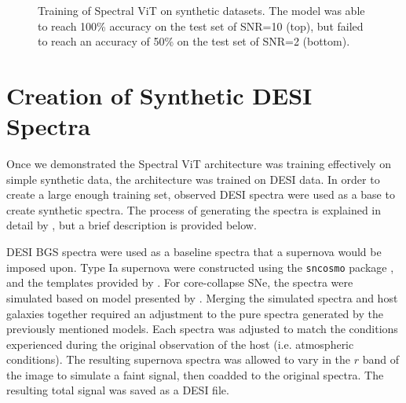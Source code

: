 \begin{figure}[h]
    \centering
    \qquad
    \caption[Verification of ViT: Synthetic Dataset]{Training of Spectral ViT on synthetic datasets. The model was able to reach 100\% accuracy on the test set of SNR=10 (top), 
    but failed to reach an accuracy of 50\% on the test set of SNR=2 (bottom).}
\label{fig:synth_spectra_training}
\end{figure}



\section{Creation of Synthetic DESI Spectra}
\label{sec:synth_data}
Once we demonstrated the Spectral ViT architecture was training effectively on simple synthetic data,
the architecture was trained on DESI data. In order to create a large enough training 
set, observed DESI spectra were used as a base to create synthetic spectra. The process of 
generating the spectra is explained in detail by \textcite{Sepeku2022}, but a brief 
description is provided below. 

DESI BGS spectra were used as a baseline spectra that a supernova would be imposed upon. 
Type Ia supernova were constructed using the \texttt{sncosmo} package \parencite{sncosmo}, and the templates 
provided by \textcite{Hsiao2007}. For core-collapse SNe, the spectra were simulated based 
on model presented by \textcite{Vincenzi2019}. Merging the simulated spectra and host galaxies together 
required an adjustment to the pure spectra generated by the previously mentioned models. Each spectra was 
adjusted to match the conditions experienced during the original observation of the host (i.e. atmospheric conditions). 
The resulting supernova spectra was allowed to vary in the $r$ band of the image to simulate a faint signal, 
then coadded to the original spectra. The resulting total signal was saved as a DESI file.


